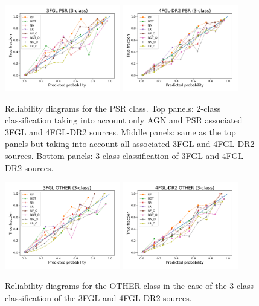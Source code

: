 \begin{figure}[ht]
\includegraphics[width=0.45\textwidth]{plots/reliability/calibration_PSR_3FGL_3classes.pdf}
\includegraphics[width=0.45\textwidth]{plots/reliability/calibration_PSR_4FGL-DR2_3classes.pdf}
\caption{Reliability diagrams for the PSR class. Top panels: 2-class classification 
taking into account only AGN and PSR associated 3FGL and 4FGL-DR2 sources.
Middle panels: same as the top panels but taking into account all associated 3FGL and 4FGL-DR2 sources.
Bottom panels: 3-class classification of 3FGL and 4FGL-DR2 sources.
}
\label{fig:rel_PSR}
\end{figure}


\begin{figure}[ht]
\centering
\hspace*{-0.5cm}
\includegraphics[width=0.45\textwidth]{plots/reliability/calibration_OTHER_3FGL_3classes.pdf}
\includegraphics[width=0.45\textwidth]{plots/reliability/calibration_OTHER_4FGL-DR2_3classes.pdf}
\caption{Reliability diagrams for the OTHER class in the case of the 3-class classification of the 3FGL and 4FGL-DR2 sources.
}
\label{fig:rel_OTHER}
\end{figure}

